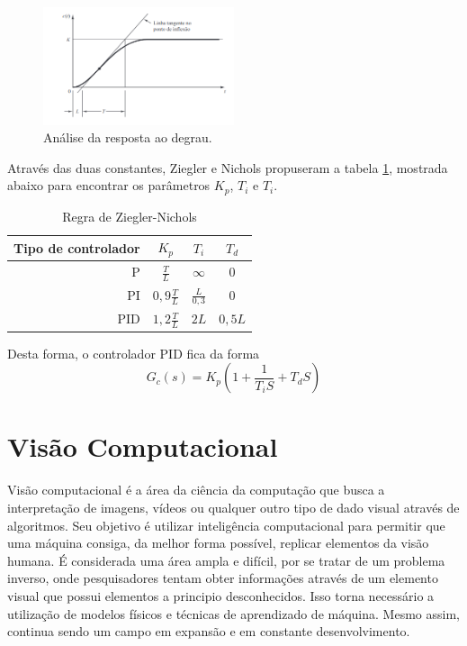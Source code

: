     \begin{figure}[ht]
        \centering
        \includegraphics[width=0.5\textwidth]{capitulos/curva_projeto_pid.png}
        \caption{Análise da resposta ao degrau.\cite{ogata2011engenharia}}
        \label{fig:curva_projeto_pid}
    \end{figure}\par
    Através das duas constantes, Ziegler e Nichols propuseram a tabela \ref{tab:tabela_ziegler_nichols}, mostrada abaixo para encontrar os parâmetros $K_{p}$, $T_{i}$ e $T_{i}$.
    \begin{table}[h!]
        \centering
        \caption{Regra de Ziegler-Nichols}
        \begin{tabular}{| r | c | c | c |}
        \hline
            Tipo de controlador & $K_{p}$ & $T_{i}$ & $T_{d}$ \\
            \hline
            P & $\frac{T}{L}$ & $\infty$ & $0$ \\
            \hline
            PI & $0,9\frac{T}{L}$ & $\frac{L}{0,3}$ & $0$ \\
            \hline
            PID & $1,2\frac{T}{L}$ & $2L$ & $0,5L$ \\
        \hline
        \end{tabular}
        \label{tab:tabela_ziegler_nichols}
    \end{table}
    \par
    Desta forma, o controlador PID fica da forma
    \begin{equation}
        G_{c}(s)= K_{p} (1 + \frac{1}{T_{i}S} + T_{d}S)
    \end{equation}
\section{Visão Computacional}
Visão computacional é a área da ciência da computação que busca a interpretação de imagens, vídeos ou qualquer outro tipo de dado visual através de algoritmos. Seu objetivo é utilizar inteligência computacional para permitir que uma máquina consiga, da melhor forma possível, replicar elementos da visão humana. É considerada uma área ampla e difícil, por se tratar de um problema inverso, onde pesquisadores tentam obter informações através de um elemento visual que possui elementos a principio desconhecidos. Isso torna necessário a utilização de modelos físicos e técnicas de aprendizado de máquina. Mesmo assim, continua sendo um campo em expansão e em constante desenvolvimento. \cite{szeliski2021computer}
